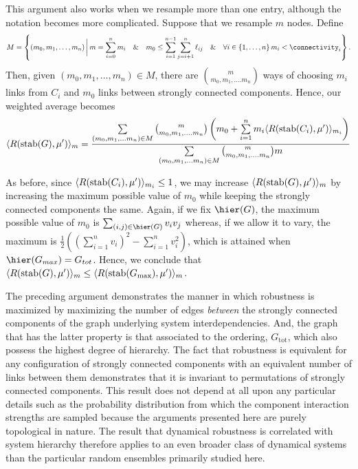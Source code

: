 This argument also works when we resample more than one entry,
although the notation becomes more complicated.  Suppose that we
resample $m$ nodes.  Define
\begin{equation*}
M = \left\{(m_0, m_1, \ldots, m_n) \,\bigg|\,
m = \sum_{i=0}^n m_i \quad\&\quad
m_0 \le \sum_{i=1}^{n-1} \sum_{j=i+1}^n \ell_{ij} \quad\&\quad
\forall i \in \{1, \ldots, n\} \, m_i < \connectivity_i \right\}.
\end{equation*}
Then, given $(m_0, m_1, \ldots, m_n) \in M$, there are ${m \choose
m_0, m_1, \ldots. m_n}$ ways of choosing $m_i$ links from $C_i$ and
$m_0$ links between strongly connected components.  Hence, our
weighted average becomes
\begin{equation}
\langle R(\hbox{stab} (G), \mu') \rangle_m =
\frac{\sum\limits_{(m_0, m_1, \ldots m_n) \in M}
      {m \choose m_0, m_1, \ldots. m_n}
      \left(m_0 + \sum\limits_{i=1}^n m_i \langle R(\hbox{stab} (C_i), \mu') \rangle_{m_i} \right)}
     {\sum\limits_{(m_0, m_1, \ldots m_n) \in M}
      {m \choose m_0, m_1, \ldots. m_n} m}
\end{equation}

As before, since $\langle R(\hbox{stab} (C_i), \mu') \rangle_{m_i} \le 1$, we may
increase $\langle R(\hbox{stab} (G), \mu') \rangle_m$ by increasing the maximum
possible value of $m_0$ while keeping the strongly connected
components the same.  Again, if we fix $\hier(G)$, the maximum
possible value of $m_0$ is $\sum_{(i,j) \in \hier(G)} v_i v_j$
whereas, if we allow it to vary, the maximum is $\frac{1}{2} ((\sum_{i=1}^n
v_i)^2 - \sum_{i=1}^n v_i^2)$, which is attained when $\hier(G_{max}) =
G_{tot}$.  Hence, we conclude that $\langle R(\hbox{stab} (G), \mu') \rangle_m \le
\langle R(\hbox{stab} (G_{\mathrm{max}}), \mu') \rangle_m$.

The preceding argument demonstrates the manner in which robustness is
maximized by maximizing the number of edges \emph{between} the strongly
connected components of the graph underlying system interdependencies.
And, the graph that has the latter property is that associated to the
ordering, $G_{\mathrm{tot}}$, which also possess the highest degree of
hierarchy. The fact that robustness is equivalent for any configuration
of strongly connected components with an equivalent number of links
between them demonstrates that it is invariant to permutations of
strongly connected components. This result does not depend at all upon
any particular details such as the probability distribution from which
the component interaction strengths are sampled because the arguments
presented here are purely topological in nature. The result that
dynamical robustness is correlated with system hierarchy therefore
applies to an even broader class of dynamical systems than the particular
random ensembles primarily studied here.
